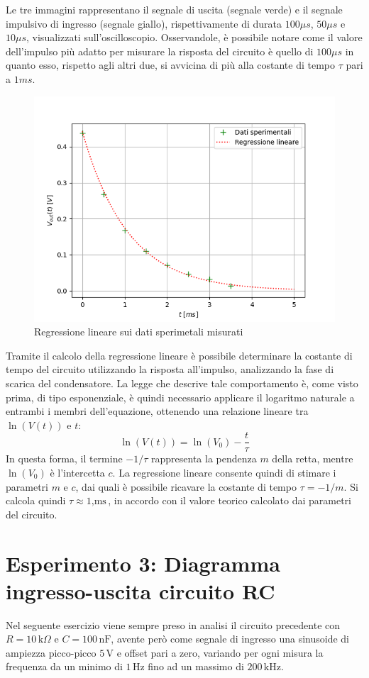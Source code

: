 Le tre immagini rappresentano il segnale di uscita (segnale verde) e il segnale impulsivo di ingresso (segnale giallo), rispettivamente di durata $100 \mu s$, $50 \mu s$ e $10 \mu s$, visualizzati sull’oscilloscopio. Osservandole, è possibile notare come il valore dell’impulso più adatto per misurare la risposta del circuito è quello di $100 \mu s$ in quanto esso, rispetto agli altri due, si avvicina di più alla costante di tempo $\tau$ pari a $1 ms$.

\begin{figure}[h]
    \centering
    \includegraphics[width=0.5\linewidth]{es2.png}
    \caption{Regressione lineare sui dati sperimetali misurati}
    \label{fig:enter-label}
\end{figure}

Tramite il calcolo della regressione lineare è possibile determinare la costante di tempo del circuito utilizzando la risposta all’impulso, analizzando la fase di scarica del condensatore. La legge che descrive tale comportamento è, come visto prima, di tipo esponenziale, è quindi necessario applicare il logaritmo naturale a entrambi i membri dell’equazione, ottenendo una relazione lineare tra $\ln(V(t))$ e $t$:
$$\ln(V(t)) = \ln(V_0) - \frac{t}{\tau}$$
In questa forma, il termine $-1/\tau$ rappresenta la pendenza $m$ della retta, mentre $\ln(V_0)$ è l’intercetta $c$. La regressione lineare consente quindi di stimare i parametri $m$ e $c$, dai quali è possibile ricavare la costante di tempo $\tau = -1/m$.
Si calcola quindi  $\tau \approx 1 $$, \text{ms}$, in accordo con il valore teorico calcolato dai parametri del circuito.



\section{Esperimento 3: Diagramma ingresso-uscita circuito RC}
Nel seguente esercizio viene sempre preso in analisi il circuito precedente con \( R = 10 \, \text{k}\Omega \) e \( C = 100 \, \text{nF} \), avente però come segnale di ingresso una sinusoide di ampiezza picco-picco \( 5 \, \text{V} \) e offset pari a zero, variando per ogni misura la frequenza da un minimo di \( 1 \, \text{Hz} \) fino ad un massimo di \( 200 \, \text{kHz} \).

